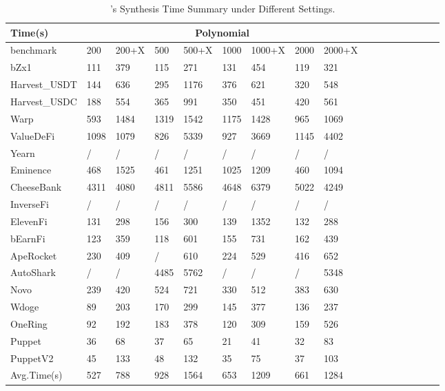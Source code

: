 \begin{table}[thbp]
    \caption{{\name}'s Synthesis Time Summary under Different Settings. }
    \addtolength{\tabcolsep}{-2.5pt}
    \centering
    \scriptsize
    \begin{tabular}{|l|llllllll|llllllll|}
    \hline
    Time(s)       & \multicolumn{8}{c|}{Polynomial}                               \\ \hline
    benchmark     & 200  & 200+X & 500  & 500+X & 1000 & 1000+X & 2000 & 2000+X   \\ \hline
    bZx1          & 111  & 379   & 115  & 271   & 131  & 454    & 119  & 321      \\
    Harvest\_USDT & 144  & 636   & 295  & 1176  & 376  & 621    & 320  & 548      \\
    Harvest\_USDC & 188  & 554   & 365  & 991   & 350  & 451    & 420  & 561      \\
    Warp          & 593  & 1484  & 1319 & 1542  & 1175 & 1428   & 965  & 1069     \\
    ValueDeFi     & 1098 & 1079  & 826  & 5339  & 927  & 3669   & 1145 & 4402     \\
    Yearn         & /    & /     & /    & /     & /    & /      & /    & /        \\
    Eminence      & 468  & 1525  & 461  & 1251  & 1025 & 1209   & 460  & 1094     \\
    CheeseBank    & 4311 & 4080  & 4811 & 5586  & 4648 & 6379   & 5022 & 4249     \\
    InverseFi     & /    & /     & /    & /     & /    & /      & /    & /        \\
    ElevenFi      & 131  & 298   & 156  & 300   & 139  & 1352   & 132  & 288      \\
    bEarnFi       & 123  & 359   & 118  & 601   & 155  & 731    & 162  & 439      \\
    ApeRocket     & 230  & 409   & /    & 610   & 224  & 529    & 416  & 652      \\
    AutoShark     & /    & /     & 4485 & 5762  & /    & /      & /    & 5348     \\
    Novo          & 239  & 420   & 524  & 721   & 330  & 512    & 383  & 630      \\
    Wdoge         & 89   & 203   & 170  & 299   & 145  & 377    & 136  & 237      \\
    OneRing       & 92   & 192   & 183  & 378   & 120  & 309    & 159  & 526      \\
    Puppet        & 36   & 68    & 37   & 65    & 21   & 41     & 32   & 83       \\
    PuppetV2      & 45   & 133   & 48   & 132   & 35   & 75     & 37   & 103      \\ \hline
    Avg.Time(s)   & 527  & 788   & 928  & 1564  & 653  & 1209   & 661  & 1284     \\ \hline
    \end{tabular}


\end{table}

